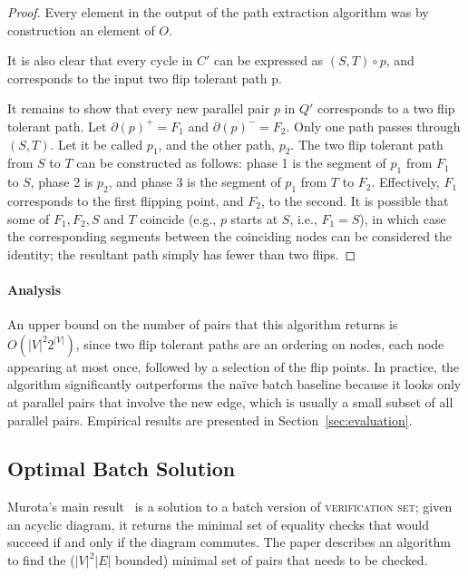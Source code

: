 \documentclass[sigplan,review,anonymous]{acmart}
\begin{document}
\begin{proof}
    Every element in the output of the path extraction algorithm was by construction an element of $O$.

    It is also clear that every cycle in $C'$ can be expressed as $(S, T) \circ p$, and corresponds to the input two flip tolerant path p.
    
    It remains to show that every new parallel pair $p$ in $Q'$ corresponds to a two flip tolerant path.
    Let $\partial(p)^+ = F_1$ and $\partial(p)^- = F_2$. 
    Only one path passes through $(S, T)$. Let it be called $p_1$, and the other path, $p_2$.
    The two flip tolerant path from $S$ to $T$ can be constructed as follows: phase 1 is the segment of $p_1$ from $F_1$ to $S$, phase 2 is $p_2$, and phase 3 is the segment of $p_1$ from $T$ to $F_2$.
    Effectively, $F_1$ corresponds to the first flipping point, and $F_2$, to the second.
    It is possible that some of $F_1, F_2, S$ and $T$ coincide (e.g., $p$ starts at $S$, i.e., $F_1 = S$), in which case the corresponding segments between the coinciding nodes can be considered the identity; the resultant path simply has fewer than two flips.
\end{proof}

\paragraph{Analysis}
An upper bound on the number of pairs that this algorithm returns is $O(|V|^{2} 2^{|V|})$, since two flip tolerant paths are an ordering on nodes, each node appearing at most once, followed by a selection of the flip points.
In practice, the algorithm significantly outperforms the na\"{i}ve batch baseline because it looks only at parallel pairs that involve the new edge, which is usually a small subset of all parallel pairs.
Empirical results are presented in Section~\ref{sec:evaluation}.

\subsection{Optimal Batch Solution}

Murota's main result~\cite{commutative} is a solution to a batch version of \textsc{verification set}; given an acyclic diagram, it returns the minimal set of equality checks that would succeed if and only if the diagram commutes.
The paper describes an algorithm to find the ($|V|^2|E|$ bounded) minimal set of pairs that needs to be checked.
\end{document}
